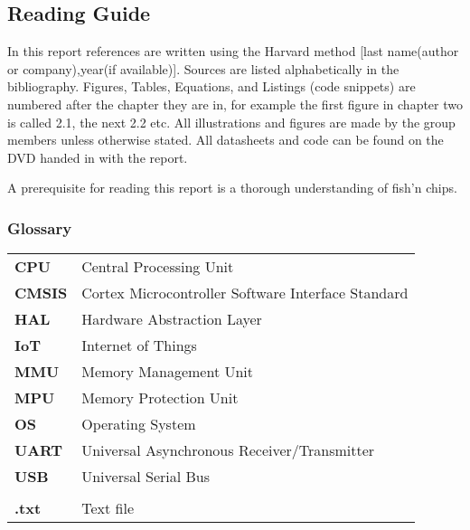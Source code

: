 \subsection*{Reading Guide}
\label{sub:reading_guide}

In this report references are written using the Harvard method [last name(author or company),year(if available)].
Sources are listed alphabetically in the bibliography.
Figures, Tables, Equations, and Listings (code snippets) are numbered after the chapter they are in,
for example the first figure in chapter two is called 2.1, the next 2.2 etc.
All illustrations and figures are made by the group members unless otherwise stated.
All datasheets and code can be found on the DVD handed in with the report.

A prerequisite for reading this report is a thorough understanding of fish'n chips.

\subsubsection*{Glossary}
\begin{longtable}{l p{12cm}}
\textbf{CPU}		& \qquad \qquad Central Processing Unit\\
\textbf{CMSIS}		& \qquad \qquad Cortex Microcontroller Software Interface Standard\\
\textbf{HAL}		& \qquad \qquad Hardware Abstraction Layer\\
\textbf{IoT}		& \qquad \qquad Internet of Things\\
\textbf{MMU}		& \qquad \qquad Memory Management Unit\\
\textbf{MPU}		& \qquad \qquad Memory Protection Unit\\
\textbf{OS}			& \qquad \qquad Operating System\\
\textbf{UART}		& \qquad \qquad Universal Asynchronous Receiver/Transmitter\\
\textbf{USB}		& \qquad \qquad Universal Serial Bus\\
					& \\
\textbf{.txt}		& \qquad \qquad Text file\\

\end{longtable}
